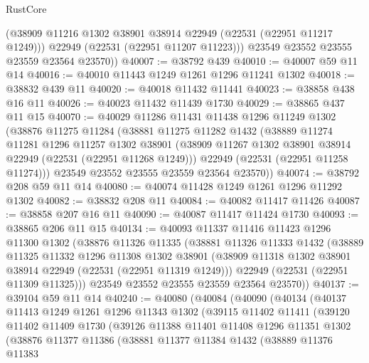 \begin{lexlean}{RustCore}
\begin{coremodule}
          (@38909 @11216 @1302 @38901 @38914 @22949 (@22531 (@22951 @11217 @1249)))
          @22949
          (@22531 (@22951 @11207 @11223)))
        @23549
        @23552
        @23555
        @23559
        @23564
        @23570))
@40007 := @38792 @439
@40010 := @40007 @59 @11 @14
@40016 := @40010 @11443 @1249 @1261 @1296 @11241 @1302
@40018 := @38832 @439 @11
@40020 := @40018 @11432 @11441
@40023 := @38858 @438 @16 @11
@40026 := @40023 @11432 @11439 @1730
@40029 := @38865 @437 @11 @15
@40070 := @40029
    @11286
    @11431
    @11438
    @1296
    @11249
    @1302
    (@38876
      @11275
      @11284
      (@38881
        @11275
        @11282
        @1432
        (@38889
          @11274
          @11281
          @1296
          @11257
          @1302
          @38901
          (@38909 @11267 @1302 @38901 @38914 @22949 (@22531 (@22951 @11268 @1249)))
          @22949
          (@22531 (@22951 @11258 @11274)))
        @23549
        @23552
        @23555
        @23559
        @23564
        @23570))
@40074 := @38792 @208 @59 @11 @14
@40080 := @40074 @11428 @1249 @1261 @1296 @11292 @1302
@40082 := @38832 @208 @11
@40084 := @40082 @11417 @11426
@40087 := @38858 @207 @16 @11
@40090 := @40087 @11417 @11424 @1730
@40093 := @38865 @206 @11 @15
@40134 := @40093
    @11337
    @11416
    @11423
    @1296
    @11300
    @1302
    (@38876
      @11326
      @11335
      (@38881
        @11326
        @11333
        @1432
        (@38889
          @11325
          @11332
          @1296
          @11308
          @1302
          @38901
          (@38909 @11318 @1302 @38901 @38914 @22949 (@22531 (@22951 @11319 @1249)))
          @22949
          (@22531 (@22951 @11309 @11325)))
        @23549
        @23552
        @23555
        @23559
        @23564
        @23570))
@40137 := @39104 @59 @11 @14
@40240 := @40080
    (@40084
      (@40090
        (@40134
          (@40137
            @11413
            @1249
            @1261
            @1296
            @11343
            @1302
            (@39115
              @11402
              @11411
              (@39120
                @11402
                @11409
                @1730
                (@39126
                  @11388
                  @11401
                  @11408
                  @1296
                  @11351
                  @1302
                  (@38876
                    @11377
                    @11386
                    (@38881
                      @11377
                      @11384
                      @1432
                      (@38889
                        @11376
                        @11383

\end{coremodule}
\end{lexlean}
